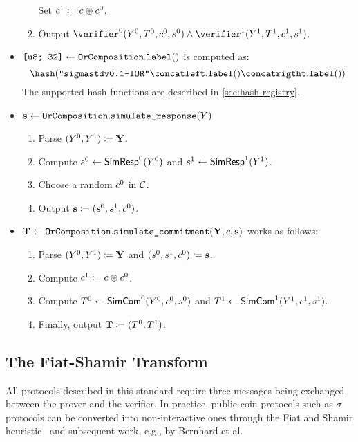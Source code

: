 \documentclass[runningheads,11pt]{article}
\begin{document}
\begin{itemize}
\begin{enumerate}
        Set $c^1\coloneqq c \oplus c^0$.
      \item
	    Output $\verifier^0(\statement^0, \commitment^0,\challenge^0,\response^0)\land\verifier^1(\statement^1, \commitment^1,\challenge^1,\response^1)$.
    \end{enumerate}
  \item  $\texttt{[u8; 32]} \gets \texttt{OrComposition}.\texttt{label}()$ is computed as:
    \[
     \hash(\texttt{''sigmastdv0.1-IOR''} \concat \firstprover.\labeltt() \concat \secondprover.\labeltt())
   \]
   The supported hash functions are described in \cref{sec:hash-registry}.
  \item
  $\mathbf {s} \gets \texttt{OrComposition}.\texttt{simulate\_response}(Y)$
    \begin{enumerate}
      \item
        Parse $(Y^0,Y^1)\coloneqq \mathbf {Y}$.
      \item
        Compute $s^0\gets\textsf{SimResp}^0(Y^0)$ and $s^1\gets\textsf{SimResp}^1(Y^1)$.
      \item
        Choose a random $c^0$ in $\mathcal{C}$.
			\item
        Output $\mathbf {s} \coloneqq (s^0,s^1,c^0)$.
    \end{enumerate}
\item
$\mathbf {T} \gets \texttt{OrComposition}.\texttt{simulate\_commitment}(\mathbf {Y}, c, \mathbf {s})$ works as follows:
\begin{enumerate}
      \item
        Parse $(Y^0,Y^1)\coloneqq \mathbf {Y}$ and $(s^0,s^1,c^0)\coloneqq\mathbf{s}$.
      \item
        Compute $c^1\coloneqq c \oplus c^0$.
      \item
        Compute $T^0 \gets\textsf{SimCom}^0(Y^0,c^0,s^0)$ and $T^1\gets\textsf{SimCom}^1(Y^1,c^1,s^1)$.
      \item
        Finally, output $\mathbf {T} \coloneqq (T^0,T^1)$.
    \end{enumerate}
\end{itemize}


\subsection{The Fiat-Shamir Transform}\label{sec:fs}
All protocols described in this standard require three messages being exchanged between the prover and the verifier.
In practice, public-coin protocols such as $\sigma$ protocols can be converted into non-interactive ones through the
Fiat and Shamir heuristic~\cite{C:FiaSha86} and subsequent work, e.g., by Bernhard et al.~\cite{AC:BerPerWar12}
\end{document}
